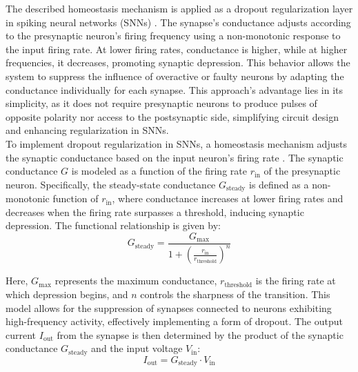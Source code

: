 \noindent The described homeostasis mechanism is applied as a dropout regularization layer in spiking neural networks (SNNs) \cite{stoffel2024spiking}. The synapse's conductance adjusts according to the presynaptic neuron's firing frequency using a non-monotonic response to the input firing rate. At lower firing rates, conductance is higher, while at higher frequencies, it decreases, promoting synaptic depression. This behavior allows the system to suppress the influence of overactive or faulty neurons by adapting the conductance individually for each synapse. This approach's advantage lies in its simplicity, as it does not require presynaptic neurons to produce pulses of opposite polarity nor access to the postsynaptic side, simplifying circuit design and enhancing regularization in SNNs.\\


\noindent To implement dropout regularization in SNNs, a homeostasis mechanism adjusts the synaptic conductance based on the input neuron's firing rate \cite{kim2021spiking}. The synaptic conductance \( G \) is modeled as a function of the firing rate \( r_{\text{in}} \) of the presynaptic neuron. Specifically, the steady-state conductance \( G_{\text{steady}} \) is defined as a non-monotonic function of \( r_{\text{in}} \), where conductance increases at lower firing rates and decreases when the firing rate surpasses a threshold, inducing synaptic depression. The functional relationship is given by:
\begin{equation}
G_{\text{steady}} = \frac{G_{\text{max}}}{1 + \left(\frac{r_{\text{in}}}{r_{\text{threshold}}}\right)^n} \label{eq:7.4}
\end{equation}


\noindent Here, \( G_{\text{max}} \) represents the maximum conductance, \( r_{\text{threshold}} \) is the firing rate at which depression begins, and \( n \) controls the sharpness of the transition. This model allows for the suppression of synapses connected to neurons exhibiting high-frequency activity, effectively implementing a form of dropout. The output current \( I_{\text{out}} \) from the synapse is then determined by the product of the synaptic conductance \( G_{\text{steady}} \) and the input voltage \( V_{\text{in}} \):
\begin{equation}
I_{\text{out}} = G_{\text{steady}} \cdot V_{\text{in}} \label{eq:7.5}
\end{equation}

